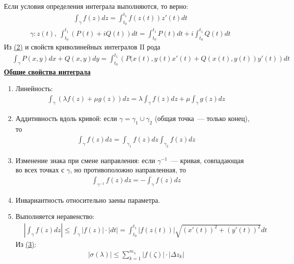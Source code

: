 \corollary
Если условия определения интеграла выполняются, \hypertarget{(3)}{то} \hypertarget{(4)}{верно:}
\begin{align}
  & \int_\gamma f(z) dz = \int_{t_0}^{t_1}f(z(t))z'(t)dt
\end{align}
\begin{align}
  &\gamma: z(t), \ \int_{t_0}^{t_1}\left( P(t) + iQ(t) \right) dt = \int_{t_0}^{t_1}P(t)dt + i \int_{t_0}^{t_1}Q(t)dt
\end{align}
\pr
Из \hyperlink{(2)}{(2)} и свойств криволинейных интегралов II рода
\begin{align*}
  &\int_{\gamma}P(x,y) dx + Q(x,y)dy = \int_{t_0}^{t_1} \left( P(x(t), y(t)x'(t) + Q(x(t), y(t))y'(t) \right) dt
\end{align*}
\underline{\textbf{Общие свойства интеграла}}
\begin{enumerate}
    \item Линейность:
    \begin{align*}
      &\int_{\gamma}\left(\lambda f(z) + \mu g(z)\right) dz = \lambda\int_{\gamma}f(z) dz + \mu \int_\gamma g(z) dz
    \end{align*}
    \item Аддитивность вдоль кривой: если $\gamma = \gamma_1 \cup \gamma_2$
    (общая точка~--- только конец), то
    \begin{align*}
      &\int_{\gamma}f(z) dz = \int_{\gamma_1}f(z) dz \int_{\gamma_2} f(z) dz
    \end{align*}
    \item Изменение знака при смене направления: если $\gamma^{-1}$~---
    кривая, совпадающая во всех точках с $\gamma$, но противоположно
    направленная, то
    \begin{align*}
      &\int_{\gamma^{-1}}f(z) dz = - \int_{\gamma}f(z) dz
    \end{align*}
    \item Инвариантность относительно заены параметра.
    \item \prop Выполняется \hypertarget{(5)}{неравенство:}
    \begin{align}
      &\left| \int_\gamma f(z) dz \right| \leq \int_{\gamma}\left| f(z) \right| \cdot \left| dt \right| = \int_{t_0}^{t_1} \left| f(z(t)) \right| \sqrt{(x'(t))^2 + (y'(t))^2}dt
    \end{align}
    \pr
    Из \hyperlink{(3)}{(3)}:
    \begin{align}
      &\left| \sigma(\lambda) \right| \leq \sum_{k = 1}^{m_\lambda}\left| f(\zeta) \right| \cdot \left| \Delta z_k \right|
    \end{align}
\end{enumerate}
